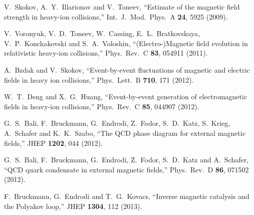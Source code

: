 \documentclass[aps,prd,amsmath,two column,amssymb,showpacs]{revtex4}
\begin{document}
\begin{thebibliography}{99}
V.~Skokov, A.~Y.~Illarionov and V.~Toneev,
``Estimate of the magnetic field strength in heavy-ion collisions,''
Int.\ J.\ Mod.\ Phys.\ A {\bf 24}, 5925 (2009).%



V.~Voronyuk, V.~D.~Toneev, W.~Cassing, E.~L.~Bratkovskaya, V.~P.~Konchakovski and S.~A.~Voloshin,
``(Electro-)Magnetic field evolution in relativistic heavy-ion collisions,''
Phys.\ Rev.\ C {\bf 83}, 054911 (2011).%



A.~Bzdak and V.~Skokov,
``Event-by-event fluctuations of magnetic and electric fields in heavy ion collisions,''
Phys.\ Lett.\ B {\bf 710}, 171 (2012).%



W.~T.~Deng and X.~G.~Huang,
``Event-by-event generation of electromagnetic fields in heavy-ion collisions,''
Phys.\ Rev.\ C {\bf 85}, 044907 (2012).%

G.~S.~Bali, F.~Bruckmann, G.~Endrodi, Z.~Fodor, S.~D.~Katz, S.~Krieg, A.~Schafer and K.~K.~Szabo,
``The QCD phase diagram for external magnetic fields,''
JHEP {\bf 1202}, 044 (2012).%



G.~S.~Bali, F.~Bruckmann, G.~Endrodi, Z.~Fodor, S.~D.~Katz and A.~Schafer,
``QCD quark condensate in external magnetic fields,''
Phys.\ Rev.\ D {\bf 86}, 071502 (2012).%



F.~Bruckmann, G.~Endrodi and T.~G.~Kovacs,
``Inverse magnetic catalysis and the Polyakov loop,''
JHEP {\bf 1304}, 112 (2013).%


\end{thebibliography}
\end{document}
